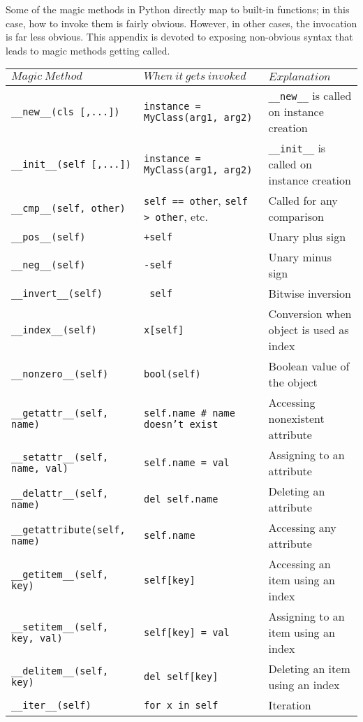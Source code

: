 \documentclass[a4paper,11pt]{article}
\newcommand{\code}[1]{\texttt{#1}}
\begin{document}
Some of the magic methods in Python directly map to built-in functions; in this case, how to invoke them is fairly obvious. However, in other cases, the invocation is far less obvious. This appendix is devoted to exposing non-obvious syntax that leads to magic methods getting called.
\begin{center}
\begin{tabular}{| p{5cm} | p{5cm} | p{5cm} |}
\hline
$Magic\ Method$ & $When\ it\ gets\ invoked$ & $Explanation$\\
\hline
\code{__new__(cls [,...])} & \code{instance = MyClass(arg1, arg2)} & \code{__new__} is called on instance creation\\
\hline
\code{__init__(self [,...])} & \code{instance = MyClass(arg1, arg2)} & \code{__init__} is called on instance creation\\
\hline
\code{__cmp__(self, other)} & \code{self == other}, \code{self > other}, etc. & Called for any comparison\\
\hline
\code{__pos__(self)} & \code{+self} & Unary plus sign\\
\hline
\code{__neg__(self)} & \code{-self} & Unary minus sign\\
\hline
\code{__invert__(self)} & \code{~self} & Bitwise inversion\\
\hline
\code{__index__(self)} & \code{x[self]} & Conversion when object is used as index\\
\hline
\code{__nonzero__(self)} & \code{bool(self)} & Boolean value of the object\\
\hline
\code{__getattr__(self, name)} & \code{self.name \# name doesn't exist} & Accessing nonexistent attribute\\
\hline
\code{__setattr__(self, name, val)} & \code{self.name = val} & Assigning to an attribute\\
\hline
\code{__delattr__(self, name)} & \code{del self.name} & Deleting an attribute\\
\hline
\code{__getattribute(self, name)} & \code{self.name} & Accessing any attribute\\
\hline
\code{__getitem__(self, key)} & \code{self[key]} & Accessing an item using an index\\
\hline
\code{__setitem__(self, key, val)} & \code{self[key] = val} & Assigning to an item using an index\\
\hline
\code{__delitem__(self, key)} & \code{del self[key]} & Deleting an item using an index\\
\hline
\code{__iter__(self)} & \code{for x in self} & Iteration\\

\end{tabular}
\end{center}
\end{document}
